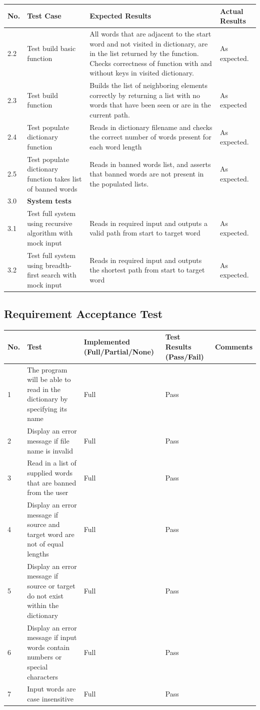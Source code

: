 \documentclass[12pt, a4]{report}
\begin{document}
		\begin{tabular}{ |p{0.5cm}|p{5cm}|p{5cm}|p{5cm}| } 
			\hline
			No. & Test Case & Expected Results & Actual Results \\
			\hline
			2.2 & Test build basic function & All words that are adjacent to the start word and not visited in dictionary, are in the list returned by the function. Checks correctness of function with and without keys in visited dictionary. & As expected. \\
			2.3 & Test build function & Builds the list of neighboring elements correctly by returning a list with no words that have been seen or are in the current path.  & As expected\\
			2.4 & Test populate dictionary function & Reads in dictionary filename and checks the correct number of words present for each word length & As expected. \\
			2.5 & Test populate dictionary function takes list of banned words & Reads in banned words list, and asserts that banned words are not present in the populated lists. & As expected. \\
			3.0 & \textbf{System tests} &  &  \\
			3.1 & Test full system using recursive algorithm with mock input & Reads in required input and outputs a valid path from start to target word & As expected. \\
			3.2 & Test full system using breadth-first search with mock input & Reads in required input and outputs the shortest path from start to target word & As expected. \\
			\hline
		\end{tabular}
	\newpage
	\subsection{Requirement Acceptance Test}
	
		\begin{tabular}{ |p{0.5cm}|p{7.25cm}|p{2.5cm}|p{2.5cm}|p{2cm}| }
			\hline
			No. & Test & Implemented (Full/Partial/None) & Test Results (Pass/Fail) & Comments \\
			\hline
			1 & The program will be able to read in the dictionary by specifying its name & Full & Pass &  \\
			2 & Display an error message if file name is invalid & Full & Pass  & \\
			3 & Read in a list of supplied words that are banned from the user & Full & Pass & \\
			4 & Display an error message if source and target word are not of equal lengths & Full & Pass & \\
			5 & Display an error message if source or target do not exist within the dictionary & Full & Pass & \\
			6 & Display an error message if input words contain numbers or special characters & Full & Pass & \\
			7 & Input words are case insensitive & Full & Pass & \\
			\hline
		\end{tabular}
	
\end{document}
